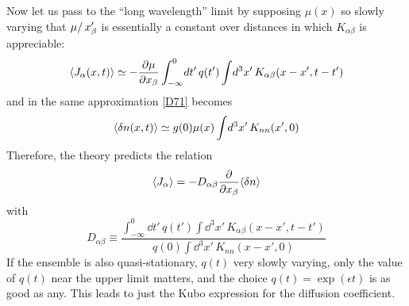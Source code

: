 Now let us pass to the ``long wavelength'' limit by supposing $\mu(x)$ so slowly varying that $\pdif{}\mu/\pdif{}x'_\beta$ is essentially a constant over distances in which $K_{\alpha\beta}$ is appreciable:
\begin{equation}
	\langle J_\alpha (x, t)\rangle \simeq -\pdv{\mu}{x_\beta} \int_{-\infty}^{0}\! \mathop{}\!d t'\, q(t') \int\! \mathop{}\!d^3 x'\, K_{\alpha\beta} (x - x', t - t')
\end{equation}
and in the same approximation \eqref{D71} becomes
\begin{equation}
	\langle\mathop{}\!\delta n(x, t)\rangle \simeq g(0) \mu(x) \int\! \mathop{}\!d^3 x'\, K_{nn}(x', 0)
\end{equation}
Therefore, the theory predicts the relation
\begin{equation}
	\label{D81}
	\langle J_\alpha\rangle = -D_{\alpha\beta} \pdv*{\langle\mathop{}\!\delta n\rangle}{x_\beta}
\end{equation}
with
\begin{equation}
	D_{\alpha\beta} \equiv \frac{\int_{-\infty}^{0}\! \dd t'\, q(t') \int\! \dd^3 x'\, K_{\alpha\beta}(x - x', t - t')}{q(0) \int\! \dd^3 x'\, K_{nn}(x - x', 0)}
\end{equation}
If the ensemble is also quasi-stationary, $q(t)$ very slowly varying, only the value of $q(t)$ near the upper limit matters, and the choice $q(t) = \exp(\epsilon t)$ is as good as any.
This leads to just the Kubo expression for the diffusion coefficient.

